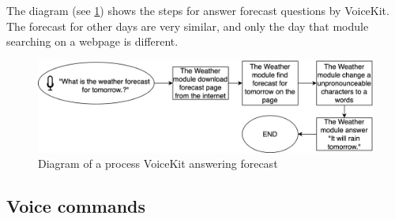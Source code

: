 % 

The diagram (see \cref{fig:forecast_weather_diagram}) shows the steps for answer forecast questions by VoiceKit. The forecast for other days are very similar, and only the day that module searching on a webpage is different.

\begin{figure}[H]
    \centering
    \includegraphics[width=\textwidth]{img/forecast_weather_diagram.png}
    \caption{Diagram of a process VoiceKit answering forecast}
    \label{fig:forecast_weather_diagram}
\end{figure}

\subsection{Voice commands}

